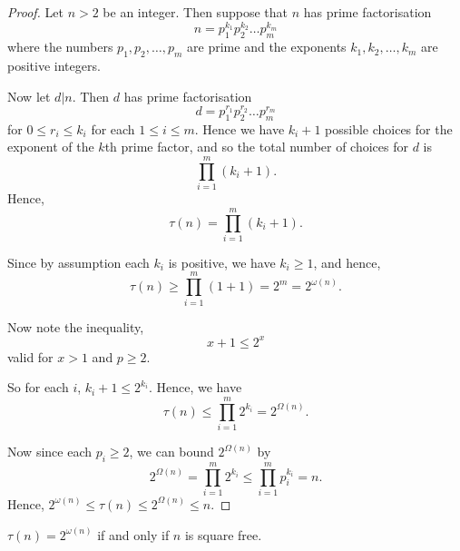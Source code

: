\documentclass{unswmaths}
\begin{document}
\begin{proof}
    Let $n > 2$ be an integer. Then suppose that $n$ has prime factorisation
    \begin{equation*}
        n = p_1^{k_1}p_2^{k_2}\ldots p_m^{k_m}
    \end{equation*}
    where the numbers $p_1,p_2,\ldots,p_m$ are prime and the exponents $k_1,k_2,\ldots,k_m$
    are positive integers.
    
    Now let $d|n$. Then $d$ has prime factorisation
    \begin{equation*}
        d = p_1^{r_1}p_2^{r_2}\ldots p_m^{r_m}
    \end{equation*}
    for $0\leq r_i \leq k_i$ for each $1\leq i \leq m$. Hence we have $k_i+1$
    possible choices for the exponent of the $k$th prime factor, and so the total
    number of choices for $d$ is
    \begin{equation*}
        \prod_{i=1}^m (k_i+1).
    \end{equation*}
    Hence,
    \begin{equation*}
        \tau(n) = \prod_{i=1}^m (k_i+1).
    \end{equation*}
    
    Since by assumption each $k_i$ is positive, we have $k_i \geq 1$, and hence,
    \begin{equation*}
        \tau(n) \geq \prod_{i=1}^m (1+1) = 2^m = 2^{\omega(n)}.
    \end{equation*}
    
    Now note the inequality,
    \begin{equation*}
        x+1\leq 2^x
    \end{equation*}
    valid for $x > 1$ and $p \geq 2$.
    
    So for each $i$, $k_i+1\leq 2^{k_i}$.
    Hence, we have
    \begin{equation*}
        \tau(n) \leq \prod_{i=1}^m 2^{k_i} = 2^{\Omega(n)}.
    \end{equation*}
    
    Now since each $p_i\geq 2$, we can bound $2^{\Omega(n)}$
    by
    \begin{equation*}
        2^{\Omega(n)} = \prod_{i=1}^m 2^{k_i} \leq \prod_{i=1}^m p_i^{k_i} = n.
    \end{equation*}
    Hence, $2^{\omega(n)}\leq \tau(n) \leq 2^{\Omega(n)} \leq n$.
\end{proof}
\begin{lemma}
    $\tau(n) = 2^{\omega(n)}$ if and only if $n$ is square free.
\end{lemma}
\end{document}

